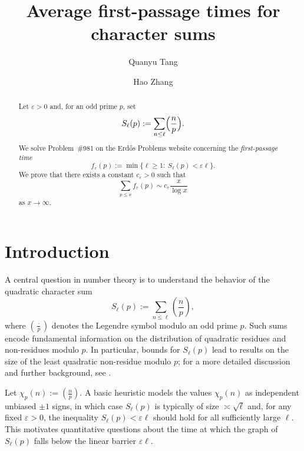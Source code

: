 \documentclass[11pt,letterpaper,reqno]{amsart}
\theoremstyle{definition}
\numberwithin{equation}{section}
\newcommand{\Leg}[2]{\left(\frac{#1}{#2}\right)}
\newcommand{\1}{\mathbf{1}}
\begin{document}
\title[Erd\H{o}s Problem \#981]{Average first-passage times for character sums}

\author[Q.~Tang]{Quanyu Tang}
\author[H.~Zhang]{Hao Zhang}

\address{School of Mathematics and Statistics, Xi'an Jiaotong University, Xi'an 710049, P. R. China}

\address{School of Mathematics, Hunan University, Changsha 410082, P. R. China}






\begin{abstract}
Let $\varepsilon>0$ and, for an odd prime $p$, set
$$
S_\ell(p):=\sum_{n\le \ell}\Bigl(\frac{n}{p}\Bigr).
$$
We solve Problem~\#981 on the Erd\H{o}s Problems website concerning the \emph{first-passage time}
$$
f_\varepsilon(p):=\min\{\ell\ge 1:\ S_\ell(p)<\varepsilon\ell\}.
$$
We prove that there exists a constant $c_\varepsilon>0$ such that
$$
\sum_{p\le x} f_\varepsilon(p)\sim c_\varepsilon \frac{x}{\log x}
$$as $x\to\infty$.
\end{abstract}







\maketitle



\section{Introduction}

A central question in number theory is to understand the behavior of the quadratic character sum
\[
S_\ell(p):=\sum_{n\le \ell}\Leg{n}{p},
\]
where $\Leg{\cdot}{p}$ denotes the Legendre symbol modulo an odd prime $p$.
Such sums encode fundamental information on the distribution of quadratic residues and non-residues
modulo $p$. In particular, bounds for $S_\ell(p)$ lead to results on the size of the least quadratic
non-residue modulo $p$; for a more detailed discussion and further background, see
\cite[Section~1]{HL}.

Let $\chi_p(n):=\Leg{n}{p}$. A basic heuristic models the values $\chi_p(n)$ as independent unbiased
$\pm 1$ signs, in which case $S_\ell(p)$ is typically of size $\asymp \sqrt{\ell}$ and, for any fixed
$\varepsilon>0$, the inequality $S_\ell(p)<\varepsilon \ell$ should hold for all sufficiently large $\ell$.
This motivates quantitative questions about the time at which the graph of $S_\ell(p)$ falls below
the linear barrier $\varepsilon\ell$.
\end{document}

